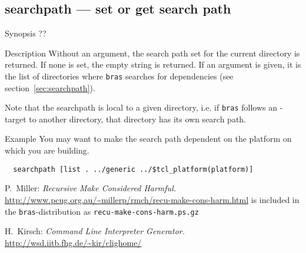 \documentclass[11pt,bibtotoc,idxtotoc]{scrreprt}
\newcommand{\bras}{\texttt{bras}}
\begin{document}
\subsection{searchpath --- set or get search path}
\begin{Describe}
\item[Synopsis]  ??
\item[Description] Without an argument, the search path set for the
  current directory is returned. If none is set, the empty string is
  returned. If an argument is given, it is the list of directories
  where \bras{} searches for dependencies (see
  section~\ref{sec:searchpath}). 

  Note that the searchpath is local to a given directory, i.e. if
  \bras{} follows an -target to another directory, that
  directory has its own search path.
\item[Example]
You may want to make the search path dependent on the platform on
which you are building.
\begin{verbatim}
  searchpath [list . ../generic ../$tcl_platform(platform)]
\end{verbatim}
\end{Describe}

\begin{thebibliography}{9}

P.~Miller:
\textit{Recursive Make Considered Harmful.} 
\href{http://www.pcug.org.au/~millerp/rmch/recu-make-cons-harm.html}{http://www\hspace{0pt}.pcug\hspace{0pt}.org\hspace{0pt}.au/\~{}millerp/rmch/recu-make-cons-harm.html}
is included in the \bras-distribution as
\texttt{recu-make-cons-harm.ps.gz}

H.~Kirsch:
\textit{Command Line Interpreter Generator.}
  \href{http://wsd.iitb.fhg.de/~kir/clighome/}{http://wsd.iitb\hspace{0pt}.fhg.de/\~{}kir\hspace{0pt}/clighome/}

\end{thebibliography}
\printindex
\end{document}
